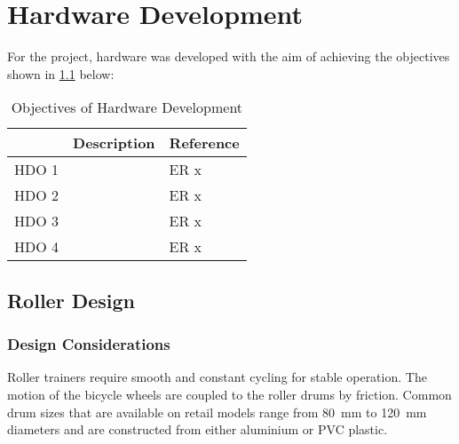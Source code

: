 
\chapter{Hardware Development}
\label{ch:hardware}
For the project, hardware was developed with the aim of achieving the objectives shown in \ref{tab:devgoals} below:

\begin{table}[H]
	\renewcommand{\arraystretch}{\tablestretch}
	\centering
	\caption{Objectives of Hardware Development}
	\begin{tabularx}{\textwidth}{p{3.2cm} >{\raggedright}X >{\raggedright\arraybackslash}p{2cm}}
		\toprule
		      & Description & Reference \\
		\midrule
		HDO 1 &             & ER x      \\
		HDO 2 &             & ER x      \\
		HDO 3 &             & ER x      \\
		HDO 4 &             & ER x      \\
		\bottomrule
	\end{tabularx}
	\label{tab:devgoals}
\end{table}

\newpage

\section{Roller Design}
\label{sec:opspeed}

\subsection{Design Considerations}

Roller trainers require smooth and constant cycling for stable operation. The motion of the bicycle wheels are coupled to the roller drums by friction. Common drum sizes that are available on retail models range from \SI{80}{\milli\meter} to \SI{120}{\milli\meter} diameters and are constructed from either aluminium or PVC plastic. 


